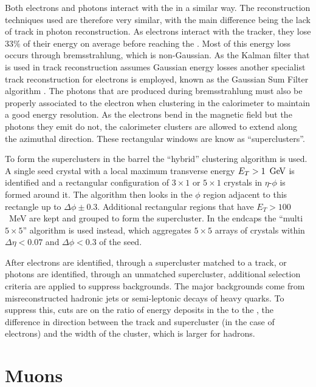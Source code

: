 Both electrons and photons interact with the \ECAL in a similar way.
The reconstruction techniques used are therefore very similar, with
the main difference being the lack of track in photon reconstruction.
As electrons interact with the tracker, they lose $33\%$ of their
energy on average before reaching the \ECAL
\cite{1748-0221-10-06-P06005}. Most of this energy loss occurs through
bremsstrahlung, which is non-Gaussian. As the Kalman filter that is
used in track reconstruction assumes Gaussian energy losses another
specialist track reconstruction for electrons is employed, known as
the Gaussian Sum Filter algorithm \cite{Adam:815410}. The photons that
are produced during bremsstrahlung must also be properly associated to
the electron when clustering in the calorimeter to maintain a good
energy resolution. As the electrons bend in the magnetic field but
the photons they emit do not, the calorimeter clusters are allowed to
extend along the azimuthal direction. These rectangular \ECAL windows
are know as ``superclusters''.

To form the superclusters in the barrel the ``hybrid'' clustering
algorithm is used. A single seed crystal with a local maximum
transverse energy $E_T>1~\mathrm{\,Ge\kern -0.1em V}$ is identified and a rectangular
configuration of $3\times 1$ or $5\times 1$ crystals in $\eta$-$\phi$
is formed around it. The algorithm then looks in the $\phi$ region
adjacent to this rectangle up to $\Delta\phi\pm 0.3$.
Additional rectangular regions that have $E_T>100$~MeV are kept and
grouped to form the supercluster. In the endcaps the ``multi $5\times
5$'' algorithm is used instead, which aggregates $5\times 5$ arrays of
crystals within $\Delta\eta<0.07$ and $\Delta\phi<0.3$ of the seed.

After electrons are identified, through a supercluster matched to a
track, or photons are identified, through an unmatched supercluster,
additional selection criteria are applied to suppress backgrounds. The
major backgrounds come from misreconstructed hadronic jets or
semi-leptonic decays of heavy quarks. To suppress this, cuts are on
the ratio of energy deposits in the \HCAL to the \ECAL, the difference
in direction between the track and supercluster (in the case of
electrons) and the width of the cluster, which is larger for hadrons.

\section{Muons}
\label{sec:muons_reco}

